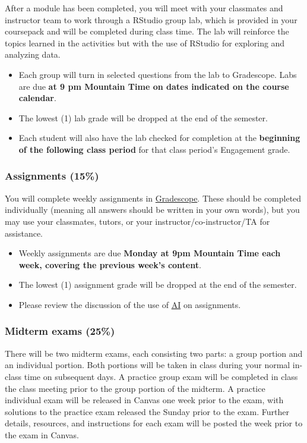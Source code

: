 \documentclass[
]{article}
\providecommand{\tightlist}{%
  \setlength{\itemsep}{0pt}\setlength{\parskip}{0pt}}
\begin{document}
After a module has been completed, you will meet with your classmates
and instructor team to work through a RStudio group lab, which is
provided in your coursepack and will be completed during class time. The
lab will reinforce the topics learned in the activities but with the use
of RStudio for exploring and analyzing data.

\begin{itemize}
\tightlist
\item
  Each group will turn in selected questions from the lab to Gradescope.
  Labs are due \textbf{at 9 pm Mountain Time on dates indicated on the
  course calendar}.
\item
  The lowest (1) lab grade will be dropped at the end of the semester.
\item
  Each student will also have the lab checked for completion at the
  \textbf{beginning of the following class period} for that class
  period's Engagement grade.
\end{itemize}

\subsubsection{Assignments (15\%)}\label{assignments-15}

You will complete weekly assignments in
\href{https://www.gradescope.com/}{Gradescope}. These should be
completed individually (meaning all answers should be written in your
own words), but you may use your classmates, tutors, or your
instructor/co-instructor/TA for assistance.

\begin{itemize}
\tightlist
\item
  Weekly assignments are due \textbf{Monday at 9pm Mountain Time each
  week, covering the previous week's content}.
\item
  The lowest (1) assignment grade will be dropped at the end of the
  semester.
\item
  Please review the discussion of the use of \hyperref[AI]{AI} on
  assignments.
\end{itemize}

\subsubsection{Midterm exams (25\%)}\label{midterm-exams-25}

There will be two midterm exams, each consisting two parts: a group
portion and an individual portion. Both portions will be taken in class
during your normal in-class time on subsequent days. A practice group
exam will be completed in class the class meeting prior to the group
portion of the midterm. A practice individual exam will be released in
Canvas one week prior to the exam, with solutions to the practice exam
released the Sunday prior to the exam. Further details, resources, and
instructions for each exam will be posted the week prior to the exam in
Canvas.
\end{document}
